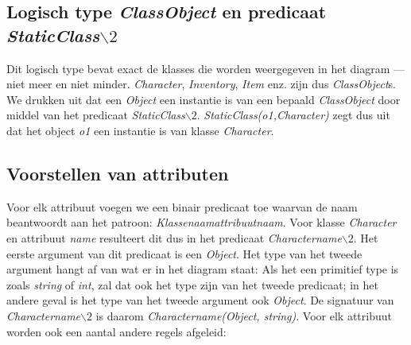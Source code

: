 \subsection{Logisch type \textit{ClassObject} en predicaat \textit{StaticClass$\backslash2$}}
Dit logisch type bevat exact de klasses die worden weergegeven in het diagram --- niet meer en niet minder. \textit{Character}, \textit{Inventory}, \textit{Item} enz. zijn dus \textit{ClassObject}s.
We drukken uit dat een \textit{Object} een instantie is van een bepaald \textit{ClassObject} door middel van het predicaat \textit{StaticClass$\backslash2$}. \textit{StaticClass(o1,Character)} zegt dus uit dat het object \textit{o1} een instantie is van klasse \textit{Character}.

\subsection{Voorstellen van attributen}
Voor elk attribuut voegen we een binair predicaat toe waarvan de naam beantwoordt aan het patroon: \textit{Klassenaamattribuutnaam}. Voor klasse \textit{Character} en attribuut \textit{name} resulteert dit dus in het predicaat \textit{Charactername$\backslash2$}. Het eerste argument van dit predicaat is een \textit{Object}. Het type van het tweede argument hangt af van wat er in het diagram staat: Als het een primitief type is zoals \textit{string} of \textit{int}, zal dat ook het type zijn van het tweede predicaat; in het andere geval is het type van het tweede argument ook \textit{Object}.
De signatuur van \textit{Charactername$\backslash2$} is daarom \textit{Charactername(Object, string)}.
Voor elk attribuut worden ook een aantal andere regels afgeleid:

